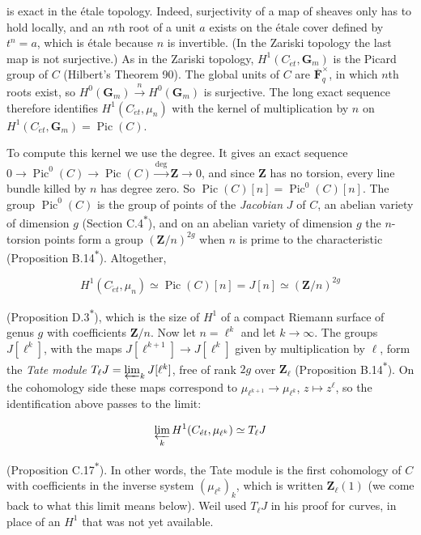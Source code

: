 \documentclass[11pt]{article}
\newcommand{\bpout}[1]{#1\textsuperscript{\hyperlink{bp-outside}{\ensuremath{\ast}}}}
\begin{document}
is exact in the étale topology. Indeed, surjectivity of a map of sheaves only has to hold locally, and an \(n\)th root of a unit \(a\) exists on the étale cover defined by \(t^n=a\), which is étale because \(n\) is invertible. (In the Zariski topology the last map is not surjective.) As in the Zariski topology, \(H^1(C_{\acute{e}t},\mathbf G_m)\) is the Picard group of \(C\) (Hilbert's Theorem 90). The global units of \(C\) are \(\overline{\mathbf F}_q^\times\), in which \(n\)th roots exist, so \(H^0(\mathbf G_m)\xrightarrow{n}H^0(\mathbf G_m)\) is surjective. The long exact sequence therefore identifies \(H^1(C_{\acute{e}t},\mu_n)\) with the kernel of multiplication by \(n\) on \(H^1(C_{\acute{e}t},\mathbf G_m)=\operatorname{Pic}(C)\).

To compute this kernel we use the degree. It gives an exact sequence \(0\to\operatorname{Pic}^0(C)\to\operatorname{Pic}(C)\xrightarrow{\deg}\mathbf Z\to0\), and since \(\mathbf Z\) has no torsion, every line bundle killed by \(n\) has degree zero. So \(\operatorname{Pic}(C)[n]=\operatorname{Pic}^0(C)[n]\). The group \(\operatorname{Pic}^0(C)\) is the group of points of the \emph{Jacobian} \(J\) of \(C\), an abelian variety of dimension \(g\) (Section \bpout{C.4}), and on an abelian variety of dimension \(g\) the \(n\)-torsion points form a group \((\mathbf Z/n)^{2g}\) when \(n\) is prime to the characteristic (Proposition \bpout{B.14}). Altogether,

\[
H^1(C_{\acute{e}t},\mu_n)\simeq\operatorname{Pic}(C)[n]=J[n]\simeq(\mathbf Z/n)^{2g}
\]

(Proposition \bpout{D.3}), which is the size of \(H^1\) of a compact Riemann surface of genus \(g\) with coefficients \(\mathbf Z/n\). Now let \(n=\ell^k\) and let \(k\to\infty\). The groups \(J[\ell^k]\), with the maps \(J[\ell^{k+1}]\to J[\ell^k]\) given by multiplication by \(\ell\), form the \emph{Tate module} \(T_\ell J=\varprojlim_kJ[\ell^k]\), free of rank \(2g\) over \(\mathbf Z_\ell\) (Proposition \bpout{B.14}). On the cohomology side these maps correspond to \(\mu_{\ell^{k+1}}\to\mu_{\ell^k}\), \(z\mapsto z^\ell\), so the identification above passes to the limit:

\[
\varprojlim_kH^1(C_{\acute{e}t},\mu_{\ell^k})\simeq T_\ell J
\]

(Proposition \bpout{C.17}). In other words, the Tate module is the first cohomology of \(C\) with coefficients in the inverse system \((\mu_{\ell^k})_k\), which is written \(\mathbf Z_\ell(1)\) (we come back to what this limit means below). Weil used \(T_\ell J\) in his proof for curves, in place of an \(H^1\) that was not yet available.
\end{document}
